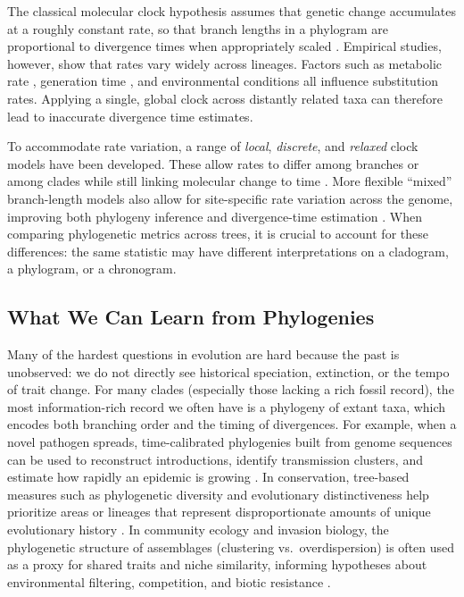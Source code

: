 The classical molecular clock hypothesis assumes that genetic change accumulates at a roughly constant rate, so that branch lengths in a phylogram are proportional to divergence times when appropriately scaled \citep{robinson_molecular_2001}. Empirical studies, however, show that rates vary widely across lineages. Factors such as metabolic rate \citep{gillooly_metabolic_2004}, generation time \citep{fu_estimating_2001}, and environmental conditions \citep{bromham_exploring_2015,liu_yeast_2019} all influence substitution rates. Applying a single, global clock across distantly related taxa can therefore lead to inaccurate divergence time estimates.

To accommodate rate variation, a range of \emph{local}, \emph{discrete}, and \emph{relaxed} clock models have been developed. These allow rates to differ among branches or among clades while still linking molecular change to time \citep{lepage_general_2007,baele_accurate_2013,ho_molecular-clock_2014}. More flexible ``mixed'' branch-length models also allow for site-specific rate variation across the genome, improving both phylogeny inference and divergence-time estimation \citep{kolaczkowski_mixed_2008}. When comparing phylogenetic metrics across trees, it is crucial to account for these differences: the same statistic may have different interpretations on a cladogram, a phylogram, or a chronogram.

\subsection{What We Can Learn from Phylogenies}

Many of the hardest questions in evolution are hard because the past is unobserved: we do not directly see historical speciation, extinction, or the tempo of trait change. For many clades (especially those lacking a rich fossil record), the most information-rich record we often have is a phylogeny of extant taxa, which encodes both branching order and the timing of divergences. For example, when a novel pathogen spreads, time-calibrated phylogenies built from genome sequences can be used to reconstruct introductions, identify transmission clusters, and estimate how rapidly an epidemic is growing \citep{grenfell_unifying_2004,pybus_evolutionary_2009,stadler_birthdeath_2013}. In conservation, tree-based measures such as phylogenetic diversity and evolutionary distinctiveness help prioritize areas or lineages that represent disproportionate amounts of unique evolutionary history \citep{faith_conservation_1992,isaac_mammals_2007}. In community ecology and invasion biology, the phylogenetic structure of assemblages (clustering vs.\ overdispersion) is often used as a proxy for shared traits and niche similarity, informing hypotheses about environmental filtering, competition, and biotic resistance \citep{webb_exploring_2000,webb_phylogenies_2002,strauss_exotic_2006}.

